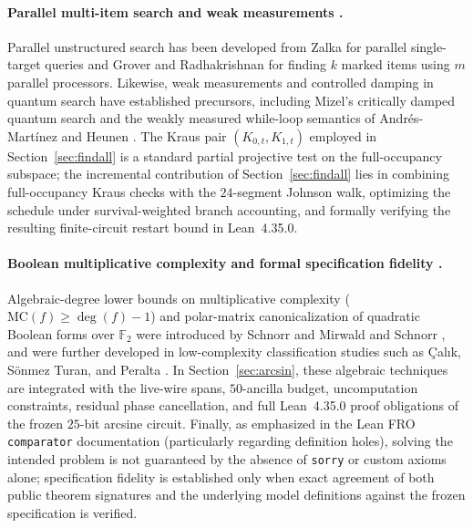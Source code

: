 \documentclass[11pt,a4paper]{article}
\theoremstyle{definition}
\theoremstyle{remark}
\begin{document}
\paragraph{Parallel multi-item search and weak measurements \cite{zalka1999,grover2004,mizel2009,andres2022}.}
Parallel unstructured search has been developed from Zalka \cite{zalka1999} for parallel single-target queries and Grover and Radhakrishnan \cite{grover2004} for finding \(k\) marked items using \(m\) parallel processors. Likewise, weak measurements and controlled damping in quantum search have established precursors, including Mizel's critically damped quantum search \cite{mizel2009} and the weakly measured while-loop semantics of Andr\'es-Mart\'inez and Heunen \cite{andres2022}. The Kraus pair \((K_{0,t}, K_{1,t})\) employed in Section~\ref{sec:findall} is a standard partial projective test on the full-occupancy subspace; the incremental contribution of Section~\ref{sec:findall} lies in combining full-occupancy Kraus checks with the \(24\)-segment Johnson walk, optimizing the schedule under survival-weighted branch accounting, and formally verifying the resulting finite-circuit restart bound in Lean~4.35.0.

\paragraph{Boolean multiplicative complexity and formal specification fidelity \cite{schnorr1989,mirwald1992,calik2020,comparator2026}.}
Algebraic-degree lower bounds on multiplicative complexity (\(\mathrm{MC}(f) \ge \deg(f) - 1\)) and polar-matrix canonicalization of quadratic Boolean forms over \(\mathbb{F}_2\) were introduced by Schnorr \cite{schnorr1989} and Mirwald and Schnorr \cite{mirwald1992}, and were further developed in low-complexity classification studies such as \c{C}al\i k, S\"onmez Turan, and Peralta \cite{calik2020}. In Section~\ref{sec:arcsin}, these algebraic techniques are integrated with the live-wire spans, \(50\)-ancilla budget, uncomputation constraints, residual phase cancellation, and full Lean~4.35.0 proof obligations of the frozen \(25\)-bit arcsine circuit. Finally, as emphasized in the Lean FRO \texttt{comparator} documentation \cite{comparator2026} (particularly regarding definition holes), solving the intended problem is not guaranteed by the absence of \texttt{sorry} or custom axioms alone; specification fidelity is established only when exact agreement of both public theorem signatures and the underlying model definitions against the frozen specification is verified.
\end{document}
